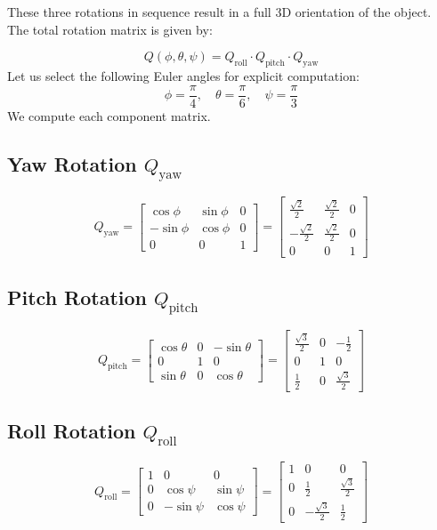 \documentclass[12pt]{article}
\begin{document}
These three rotations in sequence result in a full 3D orientation of the object. The total rotation matrix is given by:

\[
Q(\phi, \theta, \psi) = Q_{\text{roll}} \cdot Q_{\text{pitch}} \cdot Q_{\text{yaw}}
\]
Let us select the following Euler angles for explicit computation:
\[
\phi = \frac{\pi}{4}, \quad \theta = \frac{\pi}{6}, \quad \psi = \frac{\pi}{3}
\]
We compute each component matrix.

\subsection*{Yaw Rotation $Q_{\text{yaw}}$}
\[
Q_{\text{yaw}} = \begin{bmatrix}
\cos\phi & \sin\phi & 0 \\
-\sin\phi & \cos\phi & 0 \\
0 & 0 & 1
\end{bmatrix} =
\begin{bmatrix}
\frac{\sqrt{2}}{2} & \frac{\sqrt{2}}{2} & 0 \\
-\frac{\sqrt{2}}{2} & \frac{\sqrt{2}}{2} & 0 \\
0 & 0 & 1
\end{bmatrix}
\]

\subsection*{Pitch Rotation $Q_{\text{pitch}}$}
\[
Q_{\text{pitch}} = \begin{bmatrix}
\cos\theta & 0 & -\sin\theta \\
0 & 1 & 0 \\
\sin\theta & 0 & \cos\theta
\end{bmatrix} =
\begin{bmatrix}
\frac{\sqrt{3}}{2} & 0 & -\frac{1}{2} \\
0 & 1 & 0 \\
\frac{1}{2} & 0 & \frac{\sqrt{3}}{2}
\end{bmatrix}
\]

\subsection*{Roll Rotation $Q_{\text{roll}}$}
\[
Q_{\text{roll}} = \begin{bmatrix}
1 & 0 & 0 \\
0 & \cos\psi & \sin\psi \\
0 & -\sin\psi & \cos\psi
\end{bmatrix} =
\begin{bmatrix}
1 & 0 & 0 \\
0 & \frac{1}{2} & \frac{\sqrt{3}}{2} \\
0 & -\frac{\sqrt{3}}{2} & \frac{1}{2}
\end{bmatrix}
\]
\end{document}
